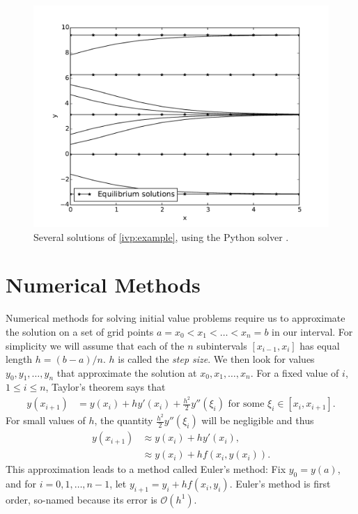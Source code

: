 \begin{figure}
\centering
\includegraphics[width=\textwidth]{Fig2.pdf}
\caption{Several solutions of \eqref{ivp:example}, using the Python solver . }
\label{ivp:int_curves}
\end{figure}


\section*{Numerical Methods}
Numerical methods for solving initial value problems require us to approximate the solution on a set of grid points $a = x_0< x_1<\hdots< x_n = b$ in our interval.  
For simplicity we will assume that each of the $n$ subintervals $[x_{i-1},x_i]$ has equal length $h = (b-a)/n$. $h$ is called the \textit{step size}. 
We then look for values $y_0, y_1, \hdots, y_n$ that approximate the solution at $x_0, x_1, \hdots, x_n$.
For a fixed value of $i$, $ 1 \leq i \leq n$, Taylor's theorem says that
\begin{align*}
y(x_{i+1}) &= y(x_{i}) + h y'(x_i) + \frac{h^2}{2} y''(\xi_i)\text{ for some }\xi_i \in [x_i,x_{i+1}].
\end{align*}
For small values of $h$, the quantity $\frac{h^2}{2} y''(\xi_i)$ will be negligible and thus
\begin{align*}
y(x_{i+1}) &\approx y(x_{i}) + h y'(x_i)  ,\\
&\approx y(x_{i}) + h f(x_i,y(x_i)).
\end{align*}
This approximation leads to a method called Euler's method: Fix $y_0 = y(a)$, and for $i = 0, 1, \hdots, n-1$, let $y_{i+1} = y_i +hf(x_i,y_i)$. 
Euler's method is first order, so-named because its error is $\mathcal{O}(h^1)$.

